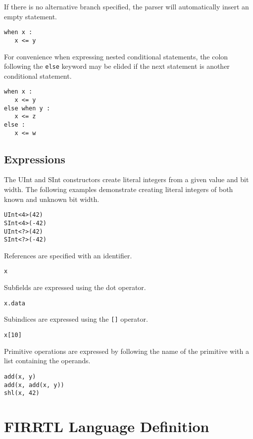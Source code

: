 \documentclass[12pt]{article}
\begin{document}
If there is no alternative branch specified, the parser will automatically insert an empty statement.
\begin{verbatim}
when x :
   x <= y
\end{verbatim}

For convenience when expressing nested conditional statements, the colon following the \verb|else| keyword may be elided if the next statement is another conditional statement.
\begin{verbatim}
when x :
   x <= y
else when y :
   x <= z
else :
   x <= w
\end{verbatim}

\subsection*{Expressions}

The UInt and SInt constructors create literal integers from a given value and bit width.
The following examples demonstrate creating literal integers of both known and unknown bit width.
\begin{verbatim}
UInt<4>(42)
SInt<4>(-42)
UInt<?>(42)
SInt<?>(-42)
\end{verbatim}

References are specified with an identifier.
\begin{verbatim}
x
\end{verbatim}

Subfields are expressed using the dot operator.
\begin{verbatim}
x.data
\end{verbatim}

Subindices are expressed using the \verb|[]| operator.
\begin{verbatim}
x[10]
\end{verbatim}

Primitive operations are expressed by following the name of the primitive with a list containing the operands. 
\begin{verbatim}
add(x, y)
add(x, add(x, y))
shl(x, 42)
\end{verbatim}

\section{FIRRTL Language Definition}
\end{document}
